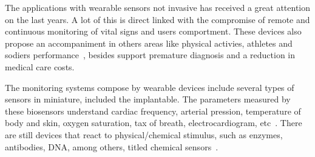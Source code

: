 
The applications with wearable sensors not invasive has received a great attention on the last years. A lot of this is direct linked with the compromise of remote and continuous monitoring of  vital signs and users comportment. These devices also propose an accompaniment in others areas like physical activies, athletes and sodiers performance~\cite{bandodkar2014non}, besides support premature diagnosis and a reduction in medical care costs.


The monitoring systems compose by wearable devices include several types of sensors in miniature, included the implantable. The parameters measured by these biosensors understand cardiac frequency, arterial pression, temperature of body and skin, oxygen saturation, tax of breath, electrocardiogram, etc~\cite{pantelopoulos2010survey}. There are still devices that react to physical/chemical stimulus, such as enzymes, antibodies, DNA, among others, titled chemical sensors~\cite{bandodkar2014non}.


